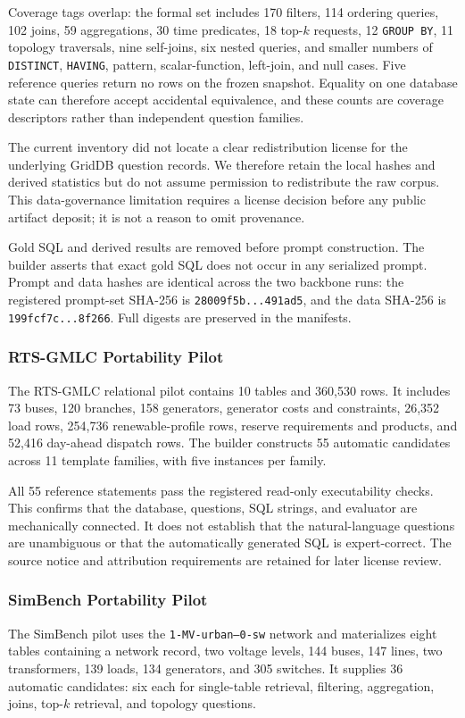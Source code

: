 \documentclass[applsci,article,submit,moreauthors]{Definitions/mdpi}
\begin{document}
Coverage tags overlap: the formal set includes 170 filters, 114 ordering queries, 102 joins, 59 aggregations, 30 time predicates, 18 top-$k$ requests, 12 \texttt{GROUP BY}, 11 topology traversals, nine self-joins, six nested queries, and smaller numbers of \texttt{DISTINCT}, \texttt{HAVING}, pattern, scalar-function, left-join, and null cases. Five reference queries return no rows on the frozen snapshot. Equality on one database state can therefore accept accidental equivalence, and these counts are coverage descriptors rather than independent question families.

The current inventory did not locate a clear redistribution license for the underlying GridDB question records. We therefore retain the local hashes and derived statistics but do not assume permission to redistribute the raw corpus. This data-governance limitation requires a license decision before any public artifact deposit; it is not a reason to omit provenance.

Gold SQL and derived results are removed before prompt construction. The builder asserts that exact gold SQL does not occur in any serialized prompt. Prompt and data hashes are identical across the two backbone runs: the registered prompt-set SHA-256 is \texttt{28009f5b...491ad5}, and the data SHA-256 is \texttt{199fcf7c...8f266}. Full digests are preserved in the manifests.

\subsubsection{RTS-GMLC Portability Pilot}
The RTS-GMLC relational pilot contains 10 tables and 360,530 rows. It includes 73 buses, 120 branches, 158 generators, generator costs and constraints, 26,352 load rows, 254,736 renewable-profile rows, reserve requirements and products, and 52,416 day-ahead dispatch rows. The builder constructs 55 automatic candidates across 11 template families, with five instances per family.

All 55 reference statements pass the registered read-only executability checks. This confirms that the database, questions, SQL strings, and evaluator are mechanically connected. It does not establish that the natural-language questions are unambiguous or that the automatically generated SQL is expert-correct. The source notice and attribution requirements are retained for later license review.

\subsubsection{SimBench Portability Pilot}
The SimBench pilot uses the \texttt{1-MV-urban--0-sw} network and materializes eight tables containing a network record, two voltage levels, 144 buses, 147 lines, two transformers, 139 loads, 134 generators, and 305 switches. It supplies 36 automatic candidates: six each for single-table retrieval, filtering, aggregation, joins, top-$k$ retrieval, and topology questions.
\end{document}

